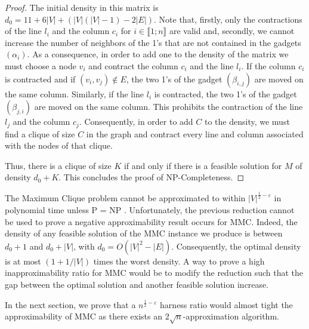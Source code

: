 \begin{proof}



The initial density in this matrix is $d_0 = 11 + 6|V| + (|V| (|V|-1) - 2|E|)$. Note that, firstly, only the contractions of the line $l_i$ and the column $c_i$ for $i \in \llbracket 1;n \rrbracket$ are valid and, secondly, we cannot increase the number of neighbors of the 1's that are not contained in the gadgets $(\alpha_i)$. As a consequence, in order to add one to the density of the matrix we must choose a node $v_i$ and contract the column $c_i$ and the line $l_i$. If the column $c_i$ is contracted and if $(v_i, v_j) \not \in E$, the two 1's of the gadget $(\beta_{i,j})$ are moved on the same column. Similarly, if the line $l_i$ is contracted, the two 1's of the gadget $(\beta_{j,i})$ are moved on the same column. This prohibits the contraction of the line $l_j$ and the column $c_j$. Consequently, in order to add $C$ to the density, we must find a clique of size $C$ in the graph and contract every line and column associated with the nodes of that clique.

Thus, there is a clique of size $K$ if and only if there is a feasible solution for $M$ of density $d_0 + K$. This concludes the proof of NP-Completeness.

\end{proof}
  
The Maximum Clique problem cannot be approximated to within $|V|^{\frac{1}{2} - \varepsilon}$ in polynomial time unless P = NP \cite{Hastad1999}. Unfortunately, the previous reduction cannot be used to prove a negative approximability result occurs for MMC. Indeed, the density of any feasible solution of the MMC instance we produce is between $d_0 + 1$ and $d_0 + |V|$, with $d_0 = O(|V|^2 - |E|)$. Consequently, the optimal density is at most $(1 + 1/|V|)$ times the worst density. A way to prove a high inapproximability ratio for MMC would be to modify the reduction such that the gap between the optimal solution and another feasible solution increase.

In the next section, we prove that a $n^{\frac{1}{2} - \varepsilon}$ harness ratio would almost tight the approximability of MMC as there exists an $2\sqrt{n}$-approximation algorithm.